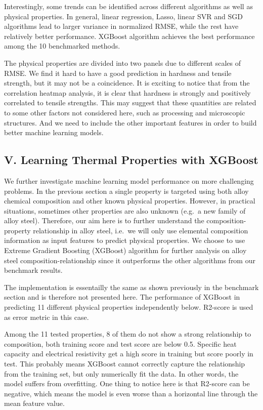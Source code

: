 \documentclass[11pt]{article}
\begin{document}
    

    Interestingly, some trends can be identified across different algorithms
as well as physical properties. In general, linear regression, Lasso,
linear SVR and SGD algorithms lead to larger variance in normalized
RMSE, while the rest have relatively better performance. XGBoost
algorithm achieves the best performance among the 10 benchmarked
methods.

The physical properties are divided into two panels due to different
scales of RMSE. We find it hard to have a good prediction in hardness
and tensile strength, but it may not be a coincidence. It is exciting to
notice that from the correlation heatmap analysis, it is clear that
hardness is strongly and positively correlated to tensile strengths.
This may suggest that these quantities are related to some other factors
not considered here, such as processing and microscopic structures. And
we need to include the other important features in order to build better
machine learning models.

    \hypertarget{v.-learning-thermal-properties-with-xgboost}{%
\subsection{V. Learning Thermal Properties with
XGBoost}\label{v.-learning-thermal-properties-with-xgboost}}

    We further investigate machine learning model performance on more
challenging problems. In the previous section a single property is
targeted using both alloy chemical composition and other known physical
properties. However, in practical situations, sometimes other properties
are also unknown (e.g.~a new family of alloy steel). Therefore, our aim
here is to further understand the composition-property relationship in
alloy steel, i.e.~we will only use elemental composition information as
input features to predict physical properties. We choose to use Extreme
Gradient Boosting (XGBoost) algorithm for further analysis on alloy
steel composition-relationship since it outperforms the other algorithms
from our benchmark results.

The implementation is essentailly the same as shown previously in the
benchmark section and is therefore not presented here. The performance
of XGBoost in predicting 11 different physical properties independently
below. R2-score is used as error metric in this case.

    

    Among the 11 tested properties, 8 of them do not show a strong
relationship to composition, both training score and test score are
below 0.5. Specific heat capacity and electrical resistivity get a high
score in training but score poorly in test. This probably means XGBoost
cannot correctly capture the relationship from the training set, but
only numerically fit the data. In other words, the model suffers from
overfitting. One thing to notice here is that R2-score can be negative,
which means the model is even worse than a horizontal line through the
mean feature value.
\end{document}
